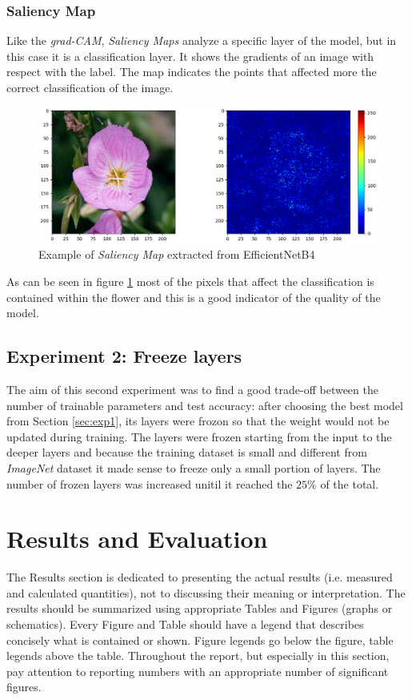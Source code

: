 \subsubsection{Saliency Map}
Like the \textit{grad-CAM}, \textit{Saliency Maps} analyze a specific layer of the model, but in this case it is a classification layer. It shows the gradients of
an image with respect with the label. The map indicates the points that affected more the correct classification of the image.
\begin{figure}[ht!]
\centering
\includegraphics[width=1\textwidth]{images/sal.png} 
\caption{Example of \textit{Saliency Map} extracted from EfficientNetB4}
\label{fig:sal}
\end{figure}

As can be seen in figure \ref{fig:sal} most of the pixels that affect the
classification is contained within the flower and this is a good indicator
of the quality of the model.







\subsection{Experiment 2: Freeze layers}\label{sec:exp2}
The aim of this second experiment was to find a good trade-off between the number of trainable parameters and test accuracy: after choosing the best model from Section \ref{sec:exp1}, its layers were frozon so that the weight would not be updated during training. The layers were frozen starting from the input to the deeper layers and because the training dataset is small and different from \textit{ImageNet} dataset it made sense to freeze only a small portion of layers. The number of frozen layers was increased unitil it reached the $25\%$ of the total.

\section{Results and Evaluation}
The Results section is dedicated to presenting the actual results (i.e. measured and calculated quantities), not to discussing their meaning or interpretation. The results should be summarized using appropriate Tables and Figures (graphs or schematics). Every Figure and Table should have a legend that describes concisely what is contained or shown. Figure legends go below the figure, table legends above the table. Throughout the report, but especially in this section, pay attention to reporting numbers with an appropriate number of significant figures. 

